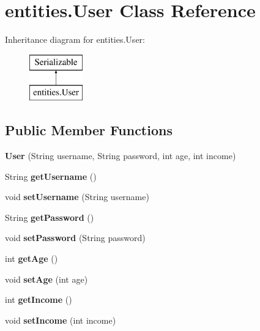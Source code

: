 \hypertarget{classentities_1_1_user}{}\section{entities.\+User Class Reference}
\label{classentities_1_1_user}
Inheritance diagram for entities.\+User\+:\begin{figure}[H]
\begin{center}
\leavevmode
\includegraphics[height=2.000000cm]{classentities_1_1_user}
\end{center}
\end{figure}
\subsection*{Public Member Functions}
\begin{DoxyCompactItemize}
\item 
\mbox{\label{classentities_1_1_user_a2ccf46feed088ecc9d5f9b63a6a07cff}} 
{\bfseries User} (String username, String password, int age, int income)
\item 
\mbox{\label{classentities_1_1_user_aefa16d22f5530bbeabc76fbfc4d3b6e5}} 
String {\bfseries get\+Username} ()
\item 
\mbox{\label{classentities_1_1_user_ae76406e3205231c307ef88876eb22285}} 
void {\bfseries set\+Username} (String username)
\item 
\mbox{\label{classentities_1_1_user_af4bcd929d86ea8ef0ad38f3a9b25cc0d}} 
String {\bfseries get\+Password} ()
\item 
\mbox{\label{classentities_1_1_user_a1a1dabaafd8b735fc247e113550d9d18}} 
void {\bfseries set\+Password} (String password)
\item 
\mbox{\label{classentities_1_1_user_a9bfc6806f1645c1202a52b6c4d0f3618}} 
int {\bfseries get\+Age} ()
\item 
\mbox{\label{classentities_1_1_user_ad6d31c3560edf1ebabce5578c6cdfffb}} 
void {\bfseries set\+Age} (int age)
\item 
\mbox{\label{classentities_1_1_user_a482592241c1eb9b07bab46b688da2618}} 
int {\bfseries get\+Income} ()
\item 
\mbox{\label{classentities_1_1_user_aead8497fc5e37885d1a8507577edc809}} 
void {\bfseries set\+Income} (int income)
\end{DoxyCompactItemize}


